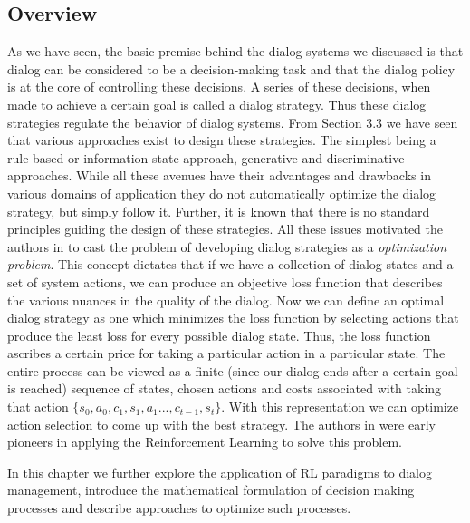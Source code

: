 \documentclass[12pt]{extarticle}
\numberwithin{equation}{section}
\begin{document}
	\subsection{Overview}
	As we have seen, the basic premise behind the dialog systems we discussed is that dialog can be considered to be a decision-making task and that the dialog policy is at the core of controlling these decisions. A series of these decisions, when made to achieve a certain goal is called a dialog strategy. Thus these dialog strategies regulate the behavior of dialog systems. From Section 3.3 we have seen that various approaches exist to design these strategies. The simplest being a rule-based or information-state approach, generative and discriminative approaches.  While all these avenues have their advantages and drawbacks in various domains of application they do not automatically optimize the dialog strategy, but simply follow it. Further, it is known that there is no standard principles guiding the design of these strategies. All these issues motivated the authors in \cite{Levin97astochastic} to cast the problem of developing dialog strategies as a \textit{optimization problem}. This concept dictates that if we have a collection of dialog states and a set of system actions, we can produce an objective loss function that describes the various nuances in the quality of the dialog. Now we can define an optimal dialog strategy as one which minimizes the loss function by selecting actions that produce the least loss for every possible dialog state. Thus, the loss function ascribes a certain price for taking a particular action in a particular state. The entire process can be viewed as a finite (since our dialog ends after a certain goal is reached) sequence of states, chosen actions and costs associated with taking that action $\{s_0,a_0,c_1,s_1,a_1...,c_{t-1},s_t\}$. With this representation we can optimize action selection to come up with the best strategy. The authors in \cite{Levin97astochastic}\cite{mdp-pieraccini} were early pioneers in applying the Reinforcement Learning to solve this problem. \par
	In this chapter we further explore the application of RL paradigms to dialog management, introduce the mathematical formulation of decision making processes and describe approaches to optimize such processes.
\end{document}
